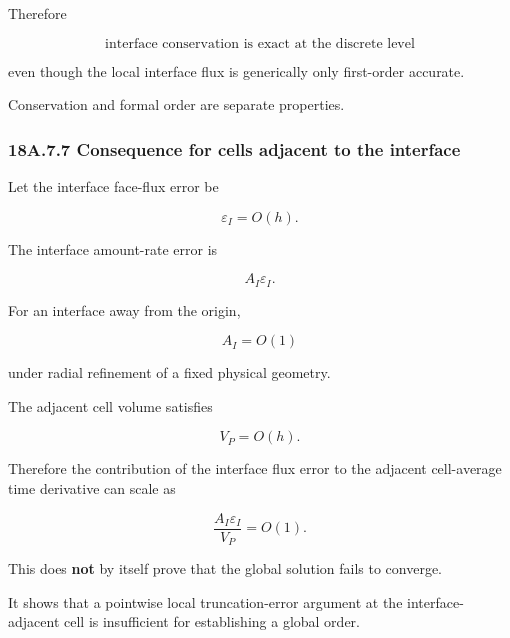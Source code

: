 \documentclass[11pt,a4paper]{article}
\begin{document}
Therefore

\begin{equation}
\boxed{
\text{interface conservation is exact at the discrete level}
}
\tag{TRISO-ACC-214}
\label{eq:triso-acc-214}
\end{equation}

even though the local interface flux is generically only first-order accurate.

Conservation and formal order are separate properties.

\subsubsection*{18A.7.7 Consequence for cells adjacent to the interface}

Let the interface face-flux error be

\begin{equation}
\varepsilon_I=O(h).
\tag{TRISO-ACC-215}
\label{eq:triso-acc-215}
\end{equation}

The interface amount-rate error is

\begin{equation}
A_I\varepsilon_I.
\tag{TRISO-ACC-216}
\label{eq:triso-acc-216}
\end{equation}

For an interface away from the origin,

\begin{equation}
A_I=O(1)
\tag{TRISO-ACC-217}
\label{eq:triso-acc-217}
\end{equation}

under radial refinement of a fixed physical geometry.

The adjacent cell volume satisfies

\begin{equation}
V_P=O(h).
\tag{TRISO-ACC-218}
\label{eq:triso-acc-218}
\end{equation}

Therefore the contribution of the interface flux error to the adjacent cell-average time derivative can scale as

\begin{equation}
\frac{
A_I\varepsilon_I
}{
V_P
}
=
O(1).
\tag{TRISO-ACC-219}
\label{eq:triso-acc-219}
\end{equation}

This does \textbf{not} by itself prove that the global solution fails to converge.

It shows that a pointwise local truncation-error argument at the interface-adjacent cell is insufficient for establishing a global order.
\end{document}
